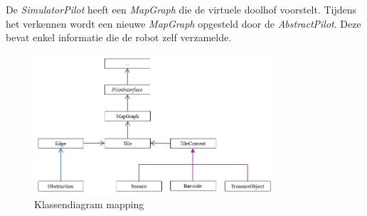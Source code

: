 \documentclass[eind]{penoverslag}
\begin{document}
De \textit{SimulatorPilot} heeft een \textit{MapGraph} die de virtuele doolhof voorstelt. Tijdens het verkennen wordt een nieuwe \textit{MapGraph} opgesteld door de \textit{AbstractPilot}. Deze bevat enkel informatie die de robot zelf verzamelde.

\begin{figure}[h]
\centering
	\includegraphics[width=0.8\textwidth]{klasMapping}
\caption{Klassendiagram mapping}
\label{fig:klasMap}
\end{figure}

%
%
%
\end{document}

